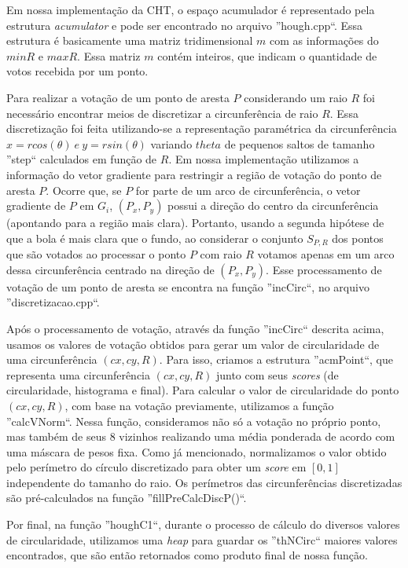\documentclass[11pt,a4paper]{article}
\begin{document}
 Em nossa implementação da CHT, o espaço acumulador é representado pela estrutura \textit{acumulator} e pode ser encontrado no arquivo ''hough.cpp``. Essa estrutura é basicamente uma matriz tridimensional $m$ com as informações do $minR$ e $maxR$. Essa matriz $m$ contém inteiros, que indicam o quantidade de votos recebida por um ponto. 

 Para realizar a votação de um ponto de aresta $P$ considerando um raio $R$ foi necessário encontrar meios de discretizar a circunferência de raio $R$. Essa discretização foi feita utilizando-se a representação paramétrica da circunferência $x = rcos(\theta) ~e~ y = rsin(\theta)$ variando $theta$ de pequenos saltos de tamanho ''step`` calculados em função de $R$. Em nossa implementação utilizamos a informação do vetor gradiente para restringir a região de votação do ponto de aresta $P$. Ocorre que, se $P$ for parte de um arco de circunferência, o vetor gradiente de $P$ em $G_i$, $(P_x,P_y)$ possui a direção do centro da circunferência (apontando para a região mais clara). Portanto, usando a segunda hipótese de que a bola é mais clara que o fundo, ao considerar o conjunto $S_{P,R}$ dos pontos que são votados ao processar o ponto $P$ com raio $R$ votamos apenas em um arco dessa circunferência centrado na direção de $(P_x,P_y)$. Esse processamento de votação de um ponto de aresta se encontra na função ''incCirc``, no arquivo ''discretizacao.cpp``.

 Após o processamento de votação, através da função ''incCirc`` descrita acima, usamos os valores de votação obtidos para gerar um valor de circularidade de uma circunferência $(cx,cy,R)$. Para isso, criamos a estrutura ''acmPoint``, que representa uma circunferência $(cx,cy,R)$ junto com seus \textit{scores} (de circularidade, histograma e final). Para calcular o valor de circularidade do ponto $(cx,cy,R)$, com base na votação previamente, utilizamos a função ''calcVNorm``. Nessa função, consideramos não só a votação no próprio ponto, mas também de seus 8 vizinhos realizando uma média ponderada de acordo com uma máscara de pesos fixa. Como já mencionado, normalizamos o valor obtido pelo perímetro do círculo discretizado para obter um \textit{score} em $[0,1]$ independente do tamanho do raio. Os perímetros das circunferências discretizadas são pré-calculados na função ''fillPreCalcDiscP()``.

Por final, na função ''houghC1``, durante o processo de cálculo do diversos valores de circularidade, utilizamos uma \textit{heap} para guardar os ''thNCirc`` maiores valores encontrados, que são então retornados como produto final de nossa função.
\end{document}
